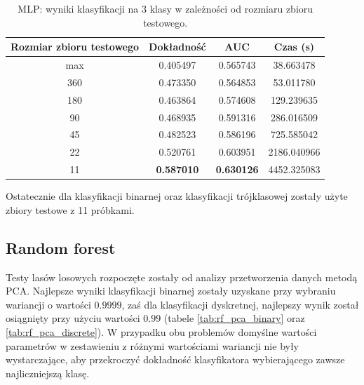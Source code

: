 \documentclass[a4paper, twoside, 11pt, openright]{article}
\begin{document}
\begin{table}[H]
    \centering
    \begin{tabular}{|c|c|c|c|}
    \hline
        \textbf{Rozmiar zbioru testowego} & \textbf{Dokładność} &  \textbf{AUC} &  \textbf{Czas (s)} \\ \hline
max                           &  0.405497 &  0.565743 &   38.663478 \\ \hline
360                         &  0.473350 &  0.564853 &   53.011780 \\ \hline
180                         &  0.463864 &  0.574608 &   129.239635 \\ \hline
90                        &  0.468935 &  0.591316 &   286.016509 \\ \hline
45                          &  0.482523 &  0.586196 &   725.585042 \\ \hline
22                         &  0.520761 &  0.603951 &  2186.040966 \\ \hline
11                          &  \textbf{0.587010} &  \textbf{0.630126} &  4452.325083 \\ \hline

    \end{tabular}
    \caption{MLP: wyniki klasyfikacji na 3 klasy w zależności od rozmiaru zbioru testowego.}
    \label{tab:nn_walk_forward_test_discrete}
\end{table}

Ostatecznie dla klasyfikacji binarnej oraz klasyfikacji trójklasowej zostały użyte zbiory testowe z 11 próbkami.

\subsection{Random forest}

Testy lasów losowych rozpoczęte zostały od analizy przetworzenia danych metodą PCA. Najlepsze wyniki klasyfikacji binarnej zostały uzyskane przy wybraniu wariancji o wartości $0.9999$, zaś dla klasyfikacji dyskretnej, najlepszy wynik został osiągnięty przy użyciu wartości $0.99$ (tabele \ref{tab:rf_pca_binary} oraz \ref{tab:rf_pca_discrete}). W przypadku obu problemów domyślne wartości parametrów w zestawieniu z różnymi wartościami wariancji nie były wystarczające, aby przekroczyć dokładność klasyfikatora wybierającego zawsze najliczniejszą klasę.
\end{document}
